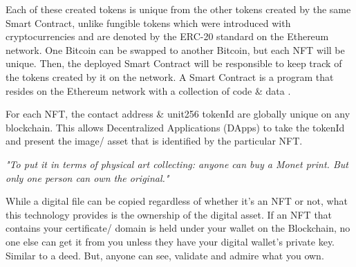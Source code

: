 \documentclass[a4paper, 12pt, oneside]{report}
\begin{document}
Each of these created tokens is unique from the other tokens created by the same Smart Contract, unlike fungible tokens which were introduced with cryptocurrencies and are denoted by the ERC-20 standard \autocite{noauthor_erc-20_nodate} on the Ethereum network. One Bitcoin can be swapped to another Bitcoin, but each NFT will be unique.
Then, the deployed Smart Contract will be responsible to keep track of the tokens created by it on the network. A Smart Contract is a program that resides on the Ethereum network with a collection of code \& data \autocite{noauthor_introduction_nodate}.

For each NFT, the contact address \& unit256 tokenId are globally unique on any blockchain. This allows Decentralized Applications (DApps) \autocite{frankenfield_decentralized_nodate, noauthor_decentralized_2021} to take the tokenId and present the image/ asset that is identified by the particular NFT.

\emph{"To put it in terms of physical art collecting: anyone can buy a Monet print. But only one person can own the original."} \autocite{clark_people_2021}

While a digital file can be copied regardless of whether it's an NFT or not, what this technology provides is the ownership of the digital asset.
If an NFT that contains your certificate/ domain is held under your wallet on the Blockchain, no one else can get it from you unless they have your digital wallet's private key. Similar to a deed. But, anyone can see, validate and admire what you own.



\end{document}
